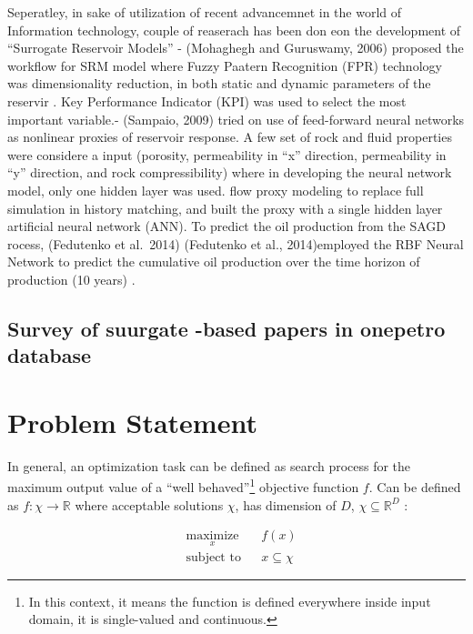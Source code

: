\documentclass[]{elsarticle} %
\begin{document}
Seperatley, in sake of utilization of recent advancemnet in the world of
Information technology, couple of reaserach has been don eon the
development of ``Surrogate Reservoir Models'' - (Mohaghegh and Guruswamy, 2006) proposed
the workflow for SRM model where Fuzzy Paatern Recognition (FPR)
technology was dimensionality reduction, in both static and dynamic
parameters of the reservir . Key Performance Indicator (KPI) was used to
select the most important variable.- (Sampaio, 2009) tried on use of
feed-forward neural networks as nonlinear proxies of reservoir response.
A few set of rock and fluid properties were considere a input (porosity,
permeability in ``x'' direction, permeability in ``y'' direction, and rock
compressibility) where in developing the neural network model, only one
hidden layer was used. flow proxy modeling to replace full simulation in
history matching, and built the proxy with a single hidden layer
artificial neural network (ANN). To predict the oil production from the
SAGD rocess, (Fedutenko et al.~2014) (Fedutenko et al., 2014)employed the RBF
Neural Network to predict the cumulative oil production over the time
horizon of production (10 years) .

\hypertarget{survey-of-suurgate--based-papers-in-onepetro-database}{%
\subsection{Survey of suurgate -based papers in onepetro database}\label{survey-of-suurgate--based-papers-in-onepetro-database}}

\newpage

\hypertarget{problem-statement}{%
\section{Problem Statement}\label{problem-statement}}

In general, an optimization task can be defined as search process for the maximum output value of a ``well behaved''\footnote{In this context, it means the function is defined everywhere inside input domain, it is single-valued and continuous.} objective function \(f\). Can be defined as \(f: \chi \rightarrow \mathbb{R}\) where acceptable solutions \(\chi\), has dimension of \(D\), \(\chi \subseteq \mathbb{R}^D\) :

\begin{equation}
\begin{aligned}
& \underset{x}{\text{maximize}}
& & f(x) \\
& \text{subject to}
& & x \subseteq \chi
\end{aligned}
\label{eq:globalopt}
\end{equation}
\end{document}

